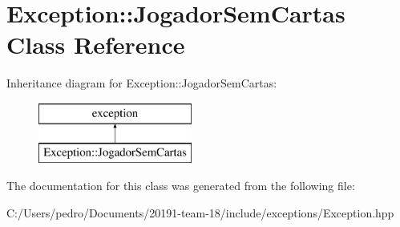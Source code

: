 \hypertarget{class_exception_1_1_jogador_sem_cartas}{}\section{Exception\+::Jogador\+Sem\+Cartas Class Reference}
\label{class_exception_1_1_jogador_sem_cartas}
Inheritance diagram for Exception\+::Jogador\+Sem\+Cartas\+:\begin{figure}[H]
\begin{center}
\leavevmode
\includegraphics[height=2.000000cm]{class_exception_1_1_jogador_sem_cartas}
\end{center}
\end{figure}


The documentation for this class was generated from the following file\+:\begin{DoxyCompactItemize}
\item 
C\+:/\+Users/pedro/\+Documents/20191-\/team-\/18/include/exceptions/Exception.\+hpp\end{DoxyCompactItemize}
